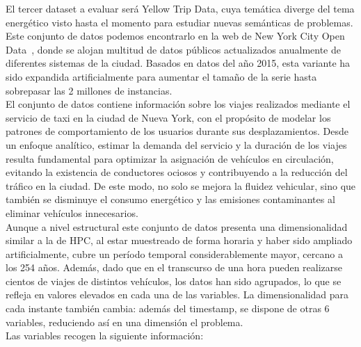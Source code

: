 El tercer dataset a evaluar será Yellow Trip Data, cuya temática diverge del tema energético visto hasta el momento para estudiar nuevas semánticas de problemas. Este conjunto de datos podemos encontrarlo en la web de New York City Open Data~\cite{nycopendata}, donde se alojan multitud de datos públicos actualizados anualmente de diferentes sistemas de la ciudad. Basados en datos del año 2015, esta variante ha sido expandida artificialmente para aumentar el tamaño de la serie hasta sobrepasar las 2 millones de instancias.\\

El conjunto de datos contiene información sobre los viajes realizados mediante el servicio de taxi en la ciudad de Nueva York, con el propósito de modelar los patrones de comportamiento de los usuarios durante sus desplazamientos. Desde un enfoque analítico, estimar la demanda del servicio y la duración de los viajes resulta fundamental para optimizar la asignación de vehículos en circulación, evitando la existencia de conductores ociosos y contribuyendo a la reducción del tráfico en la ciudad. De este modo, no solo se mejora la fluidez vehicular, sino que también se disminuye el consumo energético y las emisiones contaminantes al eliminar vehículos innecesarios.\\

Aunque a nivel estructural este conjunto de datos presenta una dimensionalidad similar a la de HPC, al estar muestreado de forma horaria y haber sido ampliado artificialmente, cubre un período temporal considerablemente mayor, cercano a los 254 años. Además, dado que en el transcurso de una hora pueden realizarse cientos de viajes de distintos vehículos, los datos han sido agrupados, lo que se refleja en valores elevados en cada una de las variables. La dimensionalidad para cada instante también cambia: además del timestamp, se dispone de otras 6 variables, reduciendo así en una dimensión el problema.\\

Las variables recogen la siguiente información:

